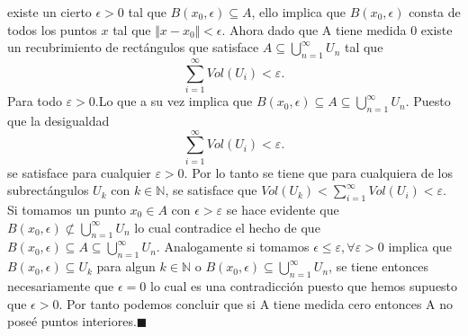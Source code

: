 \documentclass[a4paper,12pt]{article}
\begin{document}
existe un cierto $\epsilon > 0$ tal que $B(x_0,\epsilon) \subseteq A$, ello implica que $B(x_0,\epsilon)$ consta de todos
los puntos $x$ tal que $\Vert x - x_0\Vert < \epsilon$. Ahora dado que A tiene medida 0 existe un recubrimiento de
rectángulos que satisface $A \subseteq  \bigcup_{n = 1}^{\infty} U_n$  tal que
\[\sum_{i = 1}^{\infty} Vol(U_i) < \varepsilon .\]
Para todo $\varepsilon > 0$.Lo que a su vez implica que $B(x_0,\epsilon) \subseteq A \subseteq  \bigcup_{n = 1}^{\infty} U_n$. Puesto que la
desigualdad
\[\sum_{i = 1}^{\infty} Vol(U_i) < \varepsilon .\]
se satisface para cualquier $\varepsilon > 0$. Por lo tanto se tiene que para cualquiera de los subrectángulos
$U_k$ con $k \in \mathbb{N}$,
se satisface que $Vol(U_k) <  \sum_{i = 1}^{\infty} Vol(U_i) < \varepsilon $. Si tomamos un punto $x_0 \in A$ con $\epsilon > \varepsilon $ se hace
evidente que $B(x_0,\epsilon) \not \subset  \bigcup_{n = 1}^{\infty} U_n$ lo cual contradice el hecho de que
$B(x_0,\epsilon) \subseteq A \subseteq  \bigcup_{n = 1}^{\infty} U_n$. Analogamente si tomamos
$\epsilon \leq \varepsilon , \forall \varepsilon > 0$ implica que $B(x_0,\epsilon) \subseteq U_k$ para algun $k \in \mathbb{N}$
o $B(x_0,\epsilon) \subseteq  \bigcup_{n = 1}^{\infty} U_n$, se tiene entonces necesariamente que $\epsilon = 0$ lo cual es una contradicción
puesto que hemos supuesto que $\epsilon > 0$. Por tanto podemos concluir que si A tiene medida cero entonces A no poseé
puntos interiores.$\blacksquare$

\newpage
\end{document}
